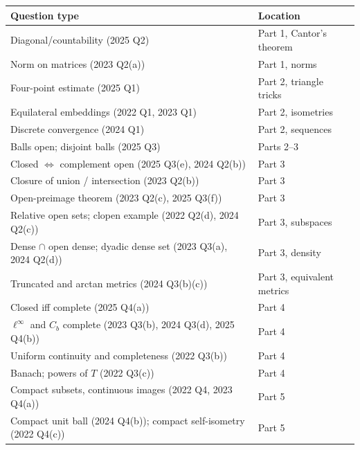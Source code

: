 \begin{center}
\renewcommand{\arraystretch}{1.15}
\begin{tabular}{@{}ll@{}}\toprule
Question type & Location\\\midrule
Diagonal/countability (2025 Q2) & Part 1, Cantor's theorem\\
Norm on matrices (2023 Q2(a)) & Part 1, norms\\
Four-point estimate (2025 Q1) & Part 2, triangle tricks\\
Equilateral embeddings (2022 Q1, 2023 Q1) & Part 2, isometries\\
Discrete convergence (2024 Q1) & Part 2, sequences\\
Balls open; disjoint balls (2025 Q3) & Parts 2--3\\
Closed $\iff$ complement open (2025 Q3(e), 2024 Q2(b)) & Part 3\\
Closure of union / intersection (2023 Q2(b)) & Part 3\\
Open-preimage theorem (2023 Q2(c), 2025 Q3(f)) & Part 3\\
Relative open sets; clopen example (2022 Q2(d), 2024 Q2(c)) & Part 3, subspaces\\
Dense $\cap$ open dense; dyadic dense set (2023 Q3(a), 2024 Q2(d)) & Part 3, density\\
Truncated and arctan metrics (2024 Q3(b)(c)) & Part 3, equivalent metrics\\
Closed iff complete (2025 Q4(a)) & Part 4\\
$\ell^\infty$ and $C_b$ complete (2023 Q3(b), 2024 Q3(d), 2025 Q4(b)) & Part 4\\
Uniform continuity and completeness (2022 Q3(b)) & Part 4\\
Banach; powers of $T$ (2022 Q3(c)) & Part 4\\
Compact subsets, continuous images (2022 Q4, 2023 Q4(a)) & Part 5\\
Compact unit ball (2024 Q4(b)); compact self-isometry (2022 Q4(c)) & Part 5\\\bottomrule
\end{tabular}
\end{center}
